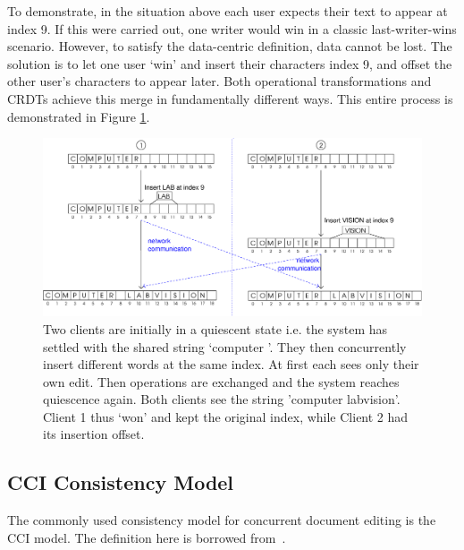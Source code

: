\documentclass[12pt,a4paper,twoside,openright]{report}
\begin{document}
	To demonstrate, in the situation above each user expects their text to appear at index 9. If this were carried out, one writer would win in a classic last-writer-wins scenario. However, to satisfy the data-centric definition, data cannot be lost. The solution is to let one user `win' and insert their characters index 9, and offset the other user's characters to appear later. Both operational transformations and CRDTs achieve this merge in fundamentally different ways. This entire process is demonstrated in Figure \ref{fig:reconcile}.
	
	\begin{figure}[htb]
	\centering
	\includegraphics[width=1\linewidth]{figs/reconcile.eps}
	\caption[Achieving Conflict Free Text Editing]{Two clients are initially in a quiescent state i.e. the system has settled with the shared string `computer '. They then concurrently insert different words at the same index. At first each sees only their own edit. Then operations are exchanged and the system reaches quiescence again. Both clients see the string 'computer labvision'. Client 1 thus `won' and kept the original index, while Client 2 had its insertion offset.}
	\label{fig:reconcile}
	\end{figure}
	
	\subsection{CCI Consistency Model} 	\label{sec:cciconsistency}
	The commonly used consistency model for concurrent document editing is the CCI model. The definition here is borrowed from~\cite{weiss2010undo}.
	
\end{document}
